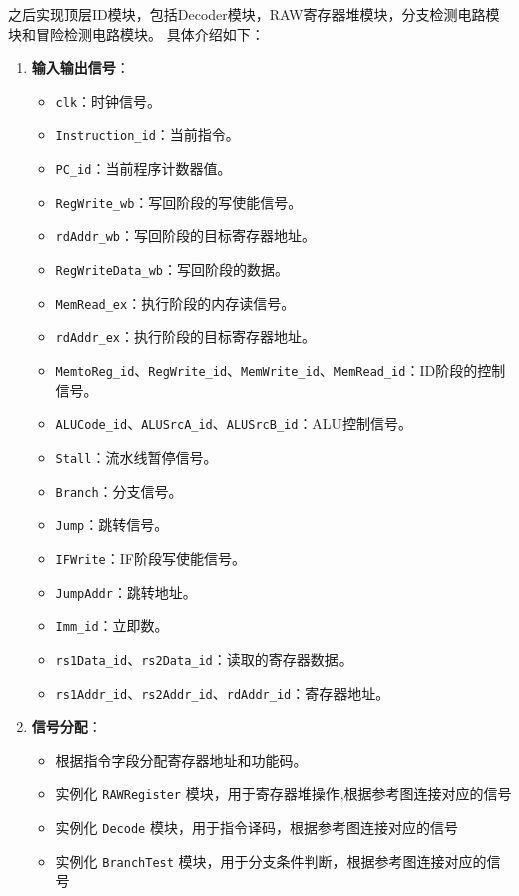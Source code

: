 \documentclass[12pt,hyperref,a4paper,UTF8]{ctexart}
\begin{document}
之后实现顶层ID模块，包括Decoder模块，RAW寄存器堆模块，分支检测电路模块和冒险检测电路模块。
具体介绍如下：
\begin{enumerate}
    \item \textbf{输入输出信号}：
    \begin{itemize}
        \item \texttt{clk}：时钟信号。
        \item \texttt{Instruction\_id}：当前指令。
        \item \texttt{PC\_id}：当前程序计数器值。
        \item \texttt{RegWrite\_wb}：写回阶段的写使能信号。
        \item \texttt{rdAddr\_wb}：写回阶段的目标寄存器地址。
        \item \texttt{RegWriteData\_wb}：写回阶段的数据。
        \item \texttt{MemRead\_ex}：执行阶段的内存读信号。
        \item \texttt{rdAddr\_ex}：执行阶段的目标寄存器地址。
        \item \texttt{MemtoReg\_id}、\texttt{RegWrite\_id}、\texttt{MemWrite\_id}、\texttt{MemRead\_id}：ID阶段的控制信号。
        \item \texttt{ALUCode\_id}、\texttt{ALUSrcA\_id}、\texttt{ALUSrcB\_id}：ALU控制信号。
        \item \texttt{Stall}：流水线暂停信号。
        \item \texttt{Branch}：分支信号。
        \item \texttt{Jump}：跳转信号。
        \item \texttt{IFWrite}：IF阶段写使能信号。
        \item \texttt{JumpAddr}：跳转地址。
        \item \texttt{Imm\_id}：立即数。
        \item \texttt{rs1Data\_id}、\texttt{rs2Data\_id}：读取的寄存器数据。
        \item \texttt{rs1Addr\_id}、\texttt{rs2Addr\_id}、\texttt{rdAddr\_id}：寄存器地址。
    \end{itemize}

    \item \textbf{信号分配}：
    \begin{itemize}
        \item 根据指令字段分配寄存器地址和功能码。
        \item 实例化 \texttt{RAWRegister} 模块，用于寄存器堆操作,根据参考图连接对应的信号
        \item 实例化 \texttt{Decode} 模块，用于指令译码，根据参考图连接对应的信号
        \item 实例化 \texttt{BranchTest} 模块，用于分支条件判断，根据参考图连接对应的信号
    \end{itemize}


\end{enumerate}
\end{document}
